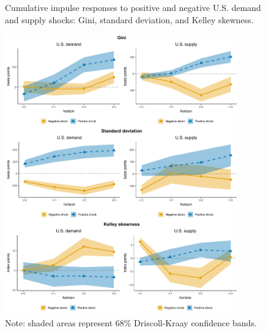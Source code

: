 \documentclass[12pt, a4paper]{article}
\begin{document}
\begin{figure}[H]
    \centering
    \caption{Cumulative impulse responses to positive and negative U.S. demand and supply shocks: Gini, standard deviation, and Kelley skewness.}
    \label{fig:demand_supply_asym}
    \includegraphics[width=0.90\textwidth]{Figures/asymmetric_IRFs_all.pdf}
    \centering \caption*{Note: shaded areas represent 68\% Driscoll-Kraay confidence bands.}
\end{figure}


\end{document}
